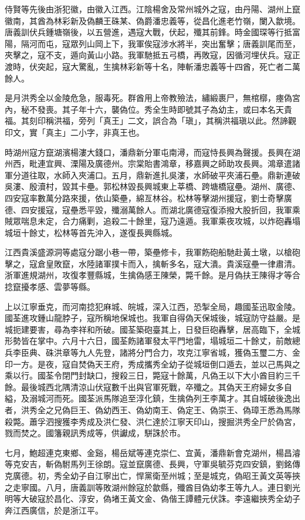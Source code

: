 \begin{pinyinscope}
侍賢等先後由浙犯徽，由徽入江西。江陰楊舍及常州城外之寇，由丹陽、湖州上竄徽南，其酋為林彩新及偽麟王硃某、偽爵潘忠義等，從昌化進老竹嶺，闌入歙境。唐義訓伏兵鍾塘嶺後，以五營進，遇寇大戰，伏起，殲其前鋒。時金國琛等行抵富陽，隔河而屯，寇眾列山岡上下，我軍俟寇涉水將半，突出奮擊；唐義訓尾而至，夾擊之，寇不支，遁向黃山小路。我軍馳抵五弓橋，再敗寇，因循河埋伏兵。寇正渡時，伏突起，寇大驚亂，生擒林彩新等十名，陣斬潘忠義等十四酋，死亡者二萬餘人。

是月洪秀全以金陵危急，服毒死。群酋用上帝教殮法，繡緞裹尸，無棺槨，瘞偽宮內，秘不發喪。其子年十六，襲偽位。秀全生時即號其子為幼主，或曰本名天貴福。其刻印稱洪福，旁列「真王」二文，誤合為「瑱」，其稱洪福瑱以此。然諦觀印文，實「真主」二小字，非真王也。

時湖州寇方竄湖濱楊漊大錢口，潘鼎新分軍屯南潯，而寇恃長興為聲援。長興在湖州西，毗連宜興、溧陽及廣德州。宗棠貽書鴻章，移嘉興之師助攻長興。鴻章遣諸軍分道往取，水師入夾浦口。五月，鼎新進扎吳漊，水師破平夾浦石壘。鼎新連破吳漊、殷瀆村，毀其卡壘。郭松林毀長興城東上莘橋、跨塘橋寇壘。湖州、廣德、四安寇率數萬分路來援，依山築壘，綿亙林谷。松林等擊湖州援寇，劉士奇擊廣德、四安援寇，寇壘悉平毀，殲溺萬餘人。而湖北廣德寇復添撥大股折回，我軍乘賊眾喘息未定，合力痛剿，追殺二十餘里，寇乃遠遁。我軍乘夜攻城，以炸砲轟塌城垣十餘丈，松林等首先沖入，遂復長興縣城。

江西貴溪盛源洞等處寇分踞小巷一帶，築壘修卡，我軍飭砲船馳赴黃土墩，以槍砲擊之，寇倉皇敗竄，水陸諸軍撲卡而入，擒斬多名，寇大潰。貴溪寇壘一律肅清。浙軍進規湖州，攻復孝豐縣城，生擒偽感王陳榮，斃千餘。是月偽扶王陳得才等合捻竄擾孝感、雲夢等縣。

上以江寧垂克，而河南捻犯麻城、皖城，深入江西，恐掣全局，趣國荃迅取金陵。國荃進攻鍾山龍脖子，寇所稱地保城也。我軍自得偽天保城後，城寇防守益嚴。是城扼建要害，尋為李祥和所破。國荃築砲臺其上，日發巨砲轟擊，居高臨下，全城形勢皆在掌中。六月十六日，國荃飭諸軍發太平門地雷，塌城垣二十餘丈，前敵總兵李臣典、硃洪章等九人先登，諸將分門合力，攻克江寧省城，獲偽玉璽二方、金印一方。是夜，寇自焚偽天王府，秀成攜秀全幼子從城垣倒口遁去，並以己馬與之乘以行。國荃令閉門封缺口，搜殺三日，斃寇十餘萬，凡偽王以下大小酋目約三千餘。最後城西北隅清涼山伏寇數千出與官軍死戰，卒殲之。其偽天王府婦女多自縊，及溺城河而死。國荃派馬隊追至淳化鎮，生擒偽列王李萬才。其自城破後逸出者，洪秀全之兄偽巨王、偽幼西王、偽幼南王、偽定王、偽崇王、偽璋王悉為馬隊殺斃。蕭孚泗搜獲李秀成及洪仁發、洪仁達於江寧天印山，搜掘洪秀全尸於偽宮，戮而焚之。國籓親訊秀成等，供讞成，駢誅於市。

七月，鮑超連克東鄉、金谿，楊岳斌等連克崇仁、宜黃，潘鼎新會克湖州，楊昌濬等克安吉，斬偽駙馬列王徐朗。寇並竄廣德、長興，守軍吳毓芬克四安鎮，劉銘傳克廣德。初，秀全幼子自江寧出亡，悍黨衛至州城；至是城克，偽昭王黃文英等挾之走寧國。八月，唐義訓等敗湖州餘寇於歙縣，殲酋目偽幼孝王等九人。連日劉光明等大破寇於昌化、淳安，偽堵王黃文金、偽偕王譚體元伏誅。李遠繼挾秀全幼子奔江西廣信，於是浙江平。


\end{pinyinscope}
